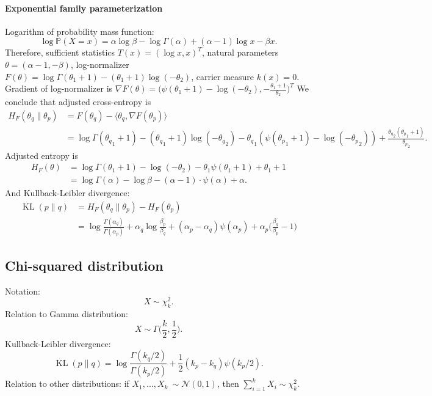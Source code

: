 \documentclass[a4paper,11pt]{article}
\theoremstyle{plain}
\theoremstyle{definition}
\newcommand{\MP}{\mathbb{P}}
\begin{document}
	\paragraph{Exponential family parameterization}
	Logarithm of probability mass function:
	\[
	\log \MP(X = x) = \alpha \log \beta - \log \Gamma(\alpha) + (\alpha - 1) \log x - \beta x.
	\]
	Therefore, sufficient statistics $T(x) = (\log x, x)^T$, natural parameters $\theta = (\alpha-1, -\beta)$, log-normalizer $F(\theta) = \log \Gamma (\theta_1 + 1) - (\theta_1 + 1) \log (-\theta_2)$, carrier measure $k(x) = 0$. Gradient of log-normalizer is $\nabla F(\theta) = \big(\psi(\theta_1 + 1) - \log(-\theta_2), -\frac{\theta_1+1}{\theta_2} \big)^T$ We conclude that adjusted cross-entropy is
	\[
	\begin{aligned}
	H_F(\theta_q \| \theta_p) &= F(\theta_q) - \langle \theta_q, \nabla F(\theta_p) \rangle \\
	&= \log \Gamma ({\theta_q}_1 + 1) - ({\theta_q}_1 + 1) \log (-{\theta_q}_2) - {\theta_q}_1 (\psi({\theta_p}_1 + 1) - \log(-{\theta_p}_2)) + \frac{{\theta_q}_2 ({\theta_p}_1 + 1)}{{\theta_p}_2}.
	\end{aligned}
	\]
	Adjusted entropy is
	\[
	\begin{aligned}
	H_F(\theta) &= \log \Gamma ({\theta}_1 + 1) - \log (-{\theta}_2) - {\theta}_1 \psi({\theta}_1 + 1) + {\theta}_1 + 1 \\
	& = \log \Gamma (\alpha) - \log \beta - (\alpha - 1) \cdot \psi (\alpha) + \alpha.
	\end{aligned}
	\]
	And Kullback-Leibler divergence:
	\[
	\begin{aligned}
	\operatorname{KL}(p \| q) &= H_F(\theta_q \| \theta_p) - H_F(\theta_p) \\
	&= \log \frac{\Gamma (\alpha_q)}{\Gamma (\alpha_p)} + \alpha_q \log \frac{\beta_p}{\beta_q} + (\alpha_p - \alpha_q) \psi(\alpha_p) + \alpha_p \bigg(\frac{\beta_q}{\beta_p} - 1\bigg)
	\end{aligned}
	\]
	
	\subsection{Chi-squared distribution}
	Notation:
	\[
	X \sim \chi_k^2.
	\]
	Relation to Gamma distribution:
	\[
	X \sim \Gamma\bigg( \frac{k}{2}, \frac{1}{2} \bigg).
	\]
	Kullback-Leibler divergence:
	\[
	\operatorname{KL}(p \| q) = \log \frac{\Gamma(k_q/2)}{\Gamma(k_p/2)} + \frac{1}{2}(k_p - k_q) \psi(k_p / 2).
	\]
	Relation to other distributions: if $X_1, \dots, X_k ~ \sim \mathcal{N}(0, 1)$, then $\sum_{i=1}^{k}X_i \sim \chi_k^2$.
	
\end{document}
